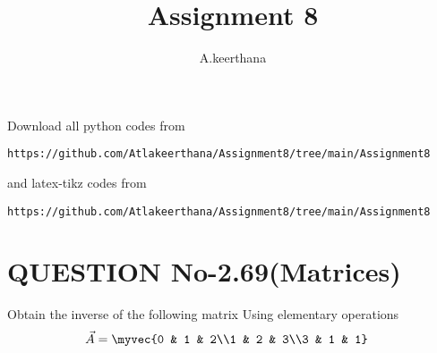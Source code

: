 \documentclass[journal,12pt,twocolumn]{IEEEtran}
\begin{document}
     \def\rightbox#1{\makebox[0in][r]{#1}}
     \def\centbox#1{\makebox[0in]{#1}}
     \def\topbox#1{\raisebox{-\baselineskip}[0in][0in]{#1}}
     \def\midbox#1{\raisebox{-0.5\baselineskip}[0in][0in]{#1}}
\vspace{3cm}
\title{Assignment 8}
\author{A.keerthana}
\maketitle
\newpage
\bigskip
\renewcommand{\thefigure}{\theenumi}
\renewcommand{\thetable}{\theenumi}
Download all python codes from 
\begin{lstlisting}
https://github.com/Atlakeerthana/Assignment8/tree/main/Assignment8
\end{lstlisting}
%
and latex-tikz codes from 
%
\begin{lstlisting}
https://github.com/Atlakeerthana/Assignment8/tree/main/Assignment8
\end{lstlisting}
%
\section{QUESTION No-2.69(Matrices)}
Obtain the inverse of the following matrix Using elementary operations
\begin{align}
\vec{A} &=\myvec {0 & 1 & 2\\1 & 2 & 3\\3 & 1 & 1}
\end{align}
\end{document}
